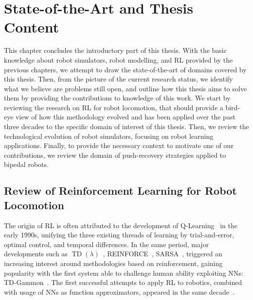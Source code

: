 \acresetall
\chapter{State-of-the-Art and Thesis Content}
\label{ch:sota}

This chapter concludes the introductory part of this thesis.
With the basic knowledge about robot simulators, robot modelling, and \ac{RL} provided by the previous chapters, we attempt to draw the state-of-the-art of domains covered by this thesis.
Then, from the picture of the current research status, we identify what we believe are problems still open, and outline how this thesis aims to solve them by providing the contributions to knowledge of this work.
We start by reviewing the research on \ac{RL} for robot locomotion, that should provide a bird-eye view of how this methodology evolved and has been applied over the past three decades to the specific domain of interest of this thesis.
Then, we review the technological evolution of robot simulators, focusing on robot learning applications.
Finally, to provide the necessary context to motivate one of our contributions, we review the domain of push-recovery strategies applied to bipedal robots.

\section{Review of Reinforcement Learning for Robot Locomotion}
\label{sec:review_rl_robot_locomotion}

The origin of \acl{RL} is often attributed to the development of Q-Learning~\parencite{watkins_christopher_learning_1989} in the early 1990s, unifying the three existing threads of learning by trial-and-error, optimal control, and temporal differences.
In the same period, major developments such as $\operatorname{TD}(\lambda)$~\parencite{sutton_learning_1988}, REINFORCE~\parencite{williams_simple_1992}, SARSA~\parencite{rummery_-line_1994}, \etc triggered an increasing interest around methodologies based on reinforcement, gaining popularity with the first system able to challenge human ability exploiting \acp{NN}: TD-Gammon~\parencite{tesauro_td-gammon_1994}.
The first successful attempts to apply \acl{RL} to robotics, combined with usage of \acp{NN} as function approximators, appeared in the same decade~\parencite{lin_reinforcement_1993, gullapalli_acquiring_1994, benbrahim_biped_1997}.

